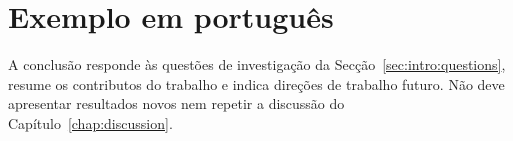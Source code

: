 \section{Exemplo em português}
\label{sec:conclusion:pt}

\begin{otherlanguage}{portuguese}

A conclusão responde às questões de investigação da
Secção~\ref{sec:intro:questions}, resume os contributos do trabalho e indica
direções de trabalho futuro. Não deve apresentar resultados novos nem
repetir a discussão do Capítulo~\ref{chap:discussion}.

\end{otherlanguage}

